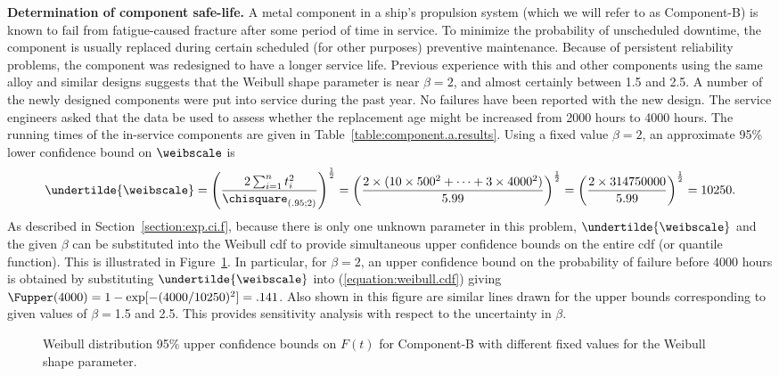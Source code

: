 \begin{example}
{\bf Determination of component safe-life.} 
A metal component in a ship's propulsion system (which we will refer
to as Component-B) is known to fail from fatigue-caused fracture after
some period of time in service. To minimize the probability of
unscheduled downtime, the component is usually replaced
during certain scheduled (for other purposes) preventive
maintenance.  Because of persistent reliability
problems, the component was redesigned to have a longer service
life.  Previous experience with this and other components using the
same alloy and similar designs suggests that the Weibull shape parameter
is near $\beta=2$, and almost certainly between 1.5 and 2.5.  A
number of the newly designed components were put into service
during the past year. No failures have been reported with the new
design. The service engineers asked that the data be
used to assess whether the replacement age might be increased
from 2000 hours to 4000 hours.  The running times of the in-service
components are given in Table~\ref{table:component.a.results}.
Using a fixed value $\beta=2$, 
an approximate 95\% lower confidence bound on $\weibscale$ is
\begin{displaymath}
\undertilde{\weibscale} = \left( \frac{2 \sum_{i=1}^{n} t_{i}^{2}}{
		\chisquare_{(.95;2)}}\right) ^{\frac{1}{2}}=
	\left( \frac{2 \times (10\times 500^{2}+\dots+3 \times 4000^{2})}{5.99}\right)^{\frac{1}{2}} =
	\left( \frac{2 \times 314750000}{5.99}\right) ^{\frac{1}{2}} = 10250.
\end{displaymath}
As described in Section~\ref{section:exp.ci.f}, because there is only
one unknown parameter in this problem, $\undertilde{\weibscale}$ and
the given $\beta$ can be substituted into the Weibull cdf to provide
simultaneous upper confidence bounds on the entire cdf (or quantile
function).  This is illustrated in
Figure~\ref{figure:comp.a.zero.fail.ps}. In particular, for $\beta=2$,
an upper confidence bound on the probability of failure before $4000$
hours is obtained by substituting $\undertilde{\weibscale}$ into
(\ref{equation:weibull.cdf}) giving $\Fupper(4000) =
1-\exp[-(4000/10250)^{2}]=.141$.  Also shown in this figure are
similar lines drawn for the upper bounds corresponding to given values
of $\beta=$1.5 and 2.5. This provides sensitivity analysis with
respect to the uncertainty in $\beta$.
\begin{figure}
\caption{Weibull distribution 95\% upper confidence bounds on $F(t)$
for Component-B with different fixed values for the Weibull shape parameter.}
\label{figure:comp.a.zero.fail.ps}
\end{figure}


\end{example}
